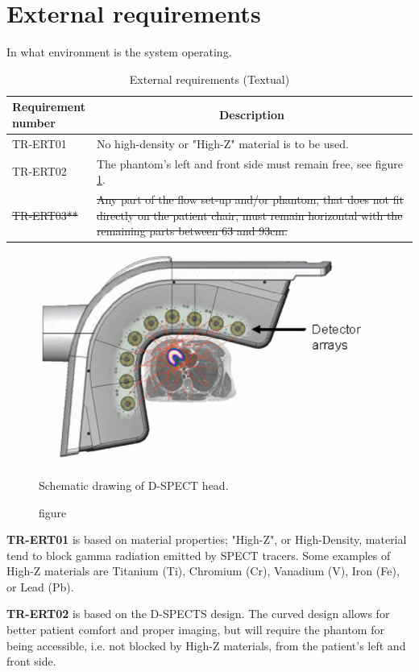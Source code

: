 \section{External requirements}
In what environment is the system operating.
\begin{table} [H]
\caption{External requirements (Textual)}
\label{tab:extreq_text}
\begin{tabular}{l|p{120mm}|}
	\makecell[l]{\textbf{Requirement} \\ \textbf{number}} & \multicolumn{1}{c}{\textbf{Description}}\\
	\hline
	TR-ERT01 & No high-density or "High-Z" material is to be used.\\ 
	TR-ERT02 & The phantom's left and front side must remain free, see figure \ref{fig:spect_surround}. \\ 
	\sout{TR-ERT03**} & \sout{Any part of the flow set-up and/or phantom, that does not fit directly on the patient chair, must remain horizontal with the remaining parts between 63 and 93cm.} \\
	\cline{2-2}
\end{tabular}
\raggedright

\end{table}

\begin{figure} [H]
  \includegraphics[width=0.5\linewidth]{./images/surrounding_spect.jpg}
  \caption{figure}{Schematic drawing of D-SPECT head\citep{erlandsson2009performance}.}
  \label{fig:spect_surround}
\end{figure}

\textbf{TR-ERT01} is based on material properties; "High-Z", or High-Density, material tend to block gamma radiation emitted by \ac{SPECT} tracers. Some examples of High-Z materials are Titanium (Ti), Chromium (Cr), Vanadium (V), Iron (Fe), or Lead (Pb).

\textbf{TR-ERT02} is based on the D-SPECTS design. The curved design allows for better patient comfort and proper imaging, but will require the phantom for being accessible, i.e. not blocked by High-Z materials, from the patient's left and front side.

